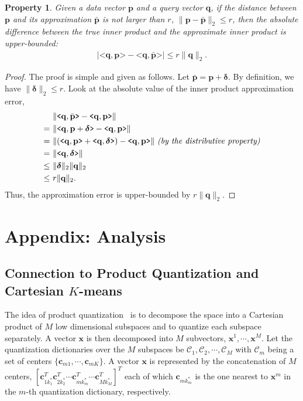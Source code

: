 \documentclass[10pt, letterpaper]{article}
\newtheorem{Property}{Property}
\begin{document}
\begin{Property}
\label{property:innerproductbound}
Given a data vector $\mathbf{p}$
and a query vector $\mathbf{q}$,
if the distance between $\mathbf{p}$
and its approximation $\bar{\mathbf{p}}$
is not larger than $r$,
$\|\mathbf{p} - \bar{\mathbf{p}}\|_2 \leqslant r$,
then the absolute difference between
the true inner product
and the approximate inner product
is upper-bounded:
\begin{align}
|\texttt{<} \mathbf{q}, \mathbf{p} \texttt{>} - \texttt{<} \mathbf{q}, \bar{\mathbf{p}} \texttt{>}|
\leqslant r \|\mathbf{q}\|_2.
\end{align}
\end{Property}
\begin{proof}
The proof is simple
and given as follows.
Let $\bar{\mathbf{p}} = \mathbf{p} + \boldsymbol{\delta}$.
By definition, we have $\|\boldsymbol{\delta}\|_2 \leq r$.
Look at the absolute value of the inner product approximation error,
\begin{align}
&\|\texttt{<} \mathbf{q}, \bar{\mathbf{p}} \texttt{>} - \texttt{<}\mathbf{q}, \mathbf{p}\texttt{>}\| \\
=~& \|\texttt{<}\mathbf{q}, \mathbf{p} + \boldsymbol{\delta}\texttt{>} - \texttt{<}\mathbf{q}, \mathbf{p}\texttt{>} \| \\
=~& \|(\texttt{<}\mathbf{q}, \mathbf{p}\texttt{>} + \texttt{<}\mathbf{q}, \boldsymbol{\delta}\texttt{>})
- \texttt{<}\mathbf{q}, \mathbf{p}\texttt{>} \|~\text{\emph {(by the distributive property)}}\\
=~& \|\texttt{<}\mathbf{q}, \boldsymbol{\delta}\texttt{>}\| \\
\leq~&\| \boldsymbol{\delta} \|_2 \| \mathbf{q} \|_2 \\
\leq~& r\| \mathbf{q} \|_2.
\end{align}
Thus, the approximation error is upper-bounded by
$r\| \mathbf{q} \|_2$.
\end{proof}


\section{Appendix: Analysis}
\subsection{Connection to Product Quantization and Cartesian $K$-means}
The idea of product quantization~\cite{JegouDS11} is
to decompose the space into a Cartesian product
of $M$ low dimensional subspaces
and to quantize each subspace separately.
A vector $\mathbf{x}$ is then
decomposed into $M$ subvectors,
$\mathbf{x}^1, \cdots, \mathbf{x}^M$.
Let the quantization dictionaries
over the $M$ subspaces
be $\mathcal{C}_1, \mathcal{C}_2, \cdots, \mathcal{C}_M$
with $\mathcal{C}_m$ being
a set of centers $\{\mathbf{c}_{m1}, \cdots, \mathbf{c}_{mK}\}$.
A vector $\mathbf{x}$ is represented
by the concatenation of $M$ centers,
$[\mathbf{c}_{1k_1^*}^T \mathbf{c}_{2k_2^*}^T
\cdots  \mathbf{c}_{mk_m^*}^T
\cdots  \mathbf{c}_{Mk_M^*}^T]^T$
each of which $\mathbf{c}_{mk_m^*}$ is the one nearest
to $\mathbf{x}^m$
in the $m$-th quantization dictionary, respectively.
\end{document}
